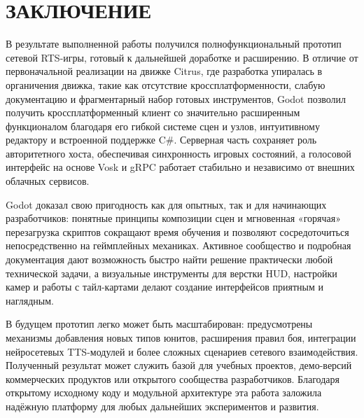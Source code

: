 \section*{ЗАКЛЮЧЕНИЕ}

В результате выполненной работы получился полнофункциональный прототип сетевой RTS-игры, готовый к дальнейшей доработке и расширению. В отличие от 
первоначальной реализации на движке Citrus, где разработка упиралась в органичения движка, такие как отсутствие кроссплатформенности, 
слабую документацию и фрагментарный набор готовых инструментов, Godot позволил получить кроссплатформенный клиент со значительно расширенным функционалом 
благодаря его гибкой системе сцен и узлов, интуитивному редактору и встроенной поддержке C\#. Серверная часть сохраняет роль авторитетного хоста, обеспечивая
синхронность игровых состояний, а голосовой интерфейс на основе Vosk и gRPC работает стабильно и независимо от внешних облачных сервисов.

Godot доказал свою пригодность как для опытных, так и для начинающих разработчиков: понятные принципы композиции сцен и мгновенная «горячая» перезагрузка 
скриптов сокращают время обучения и позволяют сосредоточиться непосредственно на геймплейных механиках. 
Активное сообщество и подробная документация дают возможность быстро найти решение практически любой технической задачи, а визуальные инструменты для 
верстки HUD, настройки камер и работы с тайл-картами делают создание интерфейсов приятным и наглядным.

В будущем прототип легко может быть масштабирован: предусмотрены механизмы добавления новых типов юнитов, расширения правил боя, интеграции нейросетевых 
TTS-модулей и более сложных сценариев сетевого взаимодействия. Полученный результат может служить базой для учебных проектов, демо-версий коммерческих 
продуктов или открытого сообщества разработчиков. Благодаря открытому исходному коду и модульной архитектуре эта работа заложила надёжную платформу 
для любых дальнейших экспериментов и развития.